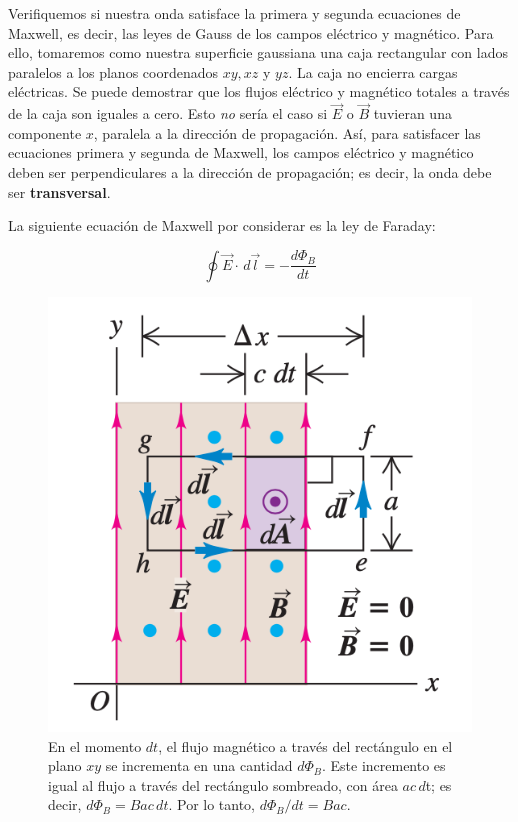 Verifiquemos si nuestra onda satisface la primera y segunda ecuaciones de Maxwell, es decir, las leyes de Gauss de los campos eléctrico y magnético. Para ello, tomaremos como nuestra superficie gaussiana una caja rectangular con lados paralelos a los planos coordenados $xy, xz$ y $yz$. La caja no encierra cargas eléctricas. Se puede demostrar que los flujos eléctrico y magnético totales a través de la caja son iguales a cero. Esto \textit{no} sería el caso si $\vec{E}$ o $\vec{B}$ tuvieran una componente $x$, paralela a la dirección de propagación. Así, para satisfacer las ecuaciones primera y segunda de Maxwell, los campos eléctrico y magnético deben ser perpendiculares a la dirección de propagación; es decir, la onda debe ser \textbf{transversal}.

La siguiente ecuación de Maxwell por considerar es la ley de Faraday:

\begin{equation}\label{32.1}
\oint\vec{E}\cdot\, d\vec{l}=-\frac{d\Phi_B}{dt}
\end{equation}

\begin{figure}[h]
\centering
\includegraphics[scale=0.5]{fig/lf}
\caption{En el momento $dt$, el flujo magnético a través del rectángulo en el plano $xy$ se incrementa en una cantidad $d\Phi_B$. Este incremento es igual al flujo a través del rectángulo sombreado, con área $ac\, d$t; es decir, $d\Phi_B=Bac\, dt$. Por lo tanto, $d\Phi_B/dt=Bac$.}
\label{fig:lf}
\end{figure}

